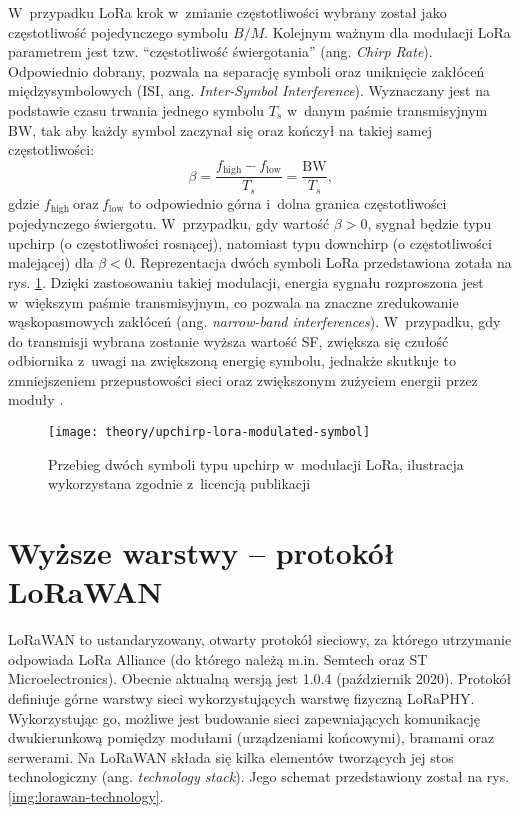 W~przypadku LoRa krok w~zmianie częstotliwości wybrany został jako częstotliwość pojedynczego symbolu $B/M$. Kolejnym
ważnym dla modulacji LoRa parametrem jest tzw. \enquote{częstotliwość świergotania} (ang. \textsl{Chirp Rate}).
Odpowiednio dobrany, pozwala na separację symboli oraz uniknięcie zakłóceń międzysymbolowych (ISI, ang.
\textsl{Inter-Symbol Interference}). Wyznaczany jest na podstawie czasu trwania jednego symbolu $T_s$ w~danym paśmie
transmisyjnym $\mathrm{BW}$, tak aby każdy symbol zaczynał się oraz kończył na takiej samej częstotliwości:
\begin{equation}
    \beta = \frac{f_{\mathrm{high}}-f_{\mathrm{low}}}{T_s}=\frac{\mathrm{BW}}{T_s}\text{,}
\end{equation}
gdzie $f_{\mathrm{high}}\ \text{oraz}\ f_{\mathrm{low}}$ to odpowiednio górna i~dolna granica częstotliwości
pojedynczego świergotu. W~przypadku, gdy wartość $\beta > 0$, sygnał będzie typu upchirp (o częstotliwości rosnącej),
natomiast typu downchirp (o częstotliwości malejącej) dla $\beta < 0$. Reprezentacja dwóch symboli LoRa
\cite{lora-emulator} przedstawiona zotała na rys. \ref{img:upchirp-lora-modulated-symbol}. Dzięki zastosowaniu takiej
modulacji, energia sygnału rozproszona jest w~większym paśmie transmisyjnym, co pozwala na znaczne zredukowanie
wąskopasmowych zakłóceń (ang. \textsl{narrow-band interferences}). W~przypadku, gdy do transmisji wybrana zostanie
wyższa wartość SF, zwiększa się czułość odbiornika z~uwagi na zwiększoną energię symbolu, jednakże skutkuje to
zmniejszeniem przepustowości sieci oraz zwiększonym zużyciem energii przez moduły \cite{css-modulation-technique}.

\begin{figure}[!htbp]
    \centering
    \texttt{[image: theory/upchirp-lora-modulated-symbol]}
    \caption{\label{img:upchirp-lora-modulated-symbol}Przebieg dwóch symboli typu upchirp w~modulacji LoRa, ilustracja
        wykorzystana zgodnie z~licencją publikacji \cite{lora-emulator}}
\end{figure}

\FloatBarrier

\section{\label{sect:lorawan}Wyższe warstwy -- protokół LoRaWAN} LoRaWAN to ustandaryzowany, otwarty protokół sieciowy,
za którego utrzymanie odpowiada LoRa Alliance (do którego należą m.in. Semtech oraz ST Microelectronics). Obecnie
aktualną wersją jest 1.0.4 (październik 2020). Protokół definiuje górne warstwy sieci wykorzystujących warstwę fizyczną
LoRaPHY. Wykorzystując go, możliwe jest budowanie sieci zapewniających komunikację dwukierunkową pomiędzy modułami
(urządzeniami końcowymi), bramami oraz serwerami. Na LoRaWAN składa się kilka elementów tworzących jej stos
technologiczny (ang. \textsl{technology stack}). Jego schemat przedstawiony został na rys. \ref{img:lorawan-technology}.

